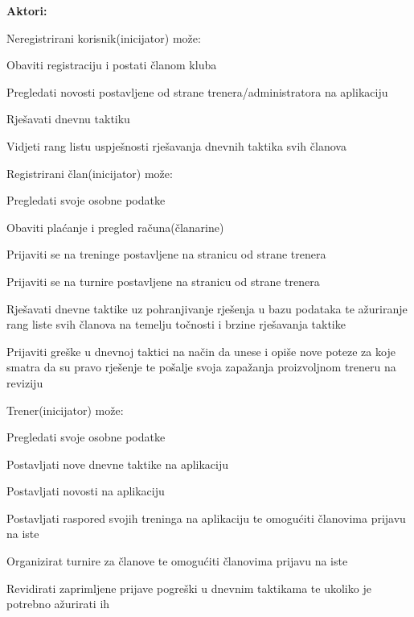 \documentclass{article}
\begin{document}
		\noindent \textbf{Aktori:}
		\begin{packed_enum}
			\item Neregistrirani korisnik(inicijator) može:
			\begin{packed_enum}
				\item Obaviti registraciju i postati članom kluba 
				\item Pregledati novosti postavljene od strane trenera/administratora na aplikaciju 
				\item Rješavati dnevnu taktiku 
				\item Vidjeti rang listu uspješnosti rješavanja dnevnih taktika svih članova
			\end{packed_enum}
			\item Registrirani član(inicijator) može:
			\begin{packed_enum}
				\item Pregledati svoje osobne podatke 
				\item Obaviti plaćanje i pregled računa(članarine) 
				\item Prijaviti se na treninge postavljene na stranicu od strane trenera 
				\item Prijaviti se na turnire postavljene na stranicu od strane trenera
				\item Rješavati dnevne taktike uz pohranjivanje rješenja u bazu podataka te ažuriranje rang liste svih članova na temelju točnosti i brzine rješavanja taktike 
				\item Prijaviti greške u dnevnoj taktici na način da unese i opiše nove poteze za koje smatra da su pravo rješenje te pošalje svoja zapažanja proizvoljnom treneru na reviziju 
			\end{packed_enum}
			\item Trener(inicijator) može:
			\begin{packed_enum}
				\item Pregledati svoje osobne podatke 
				\item Postavljati nove dnevne taktike na aplikaciju 
				\item Postavljati novosti na aplikaciju 
				\item Postavljati raspored svojih treninga na aplikaciju te omogućiti članovima prijavu na iste 
				\item Organizirat turnire za članove te omogućiti članovima prijavu na iste 
				\item Revidirati zaprimljene prijave pogreški u dnevnim taktikama te ukoliko je potrebno ažurirati ih 
			\end{packed_enum}

\end{packed_enum}
\end{document}
